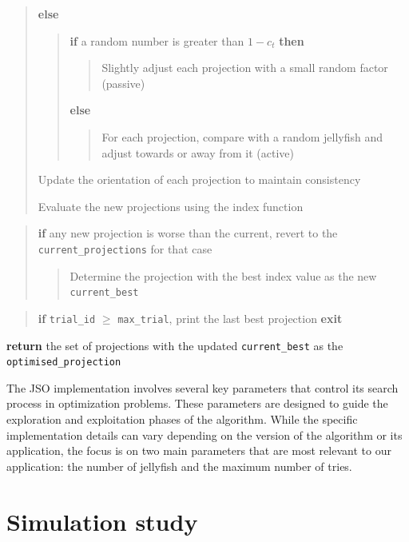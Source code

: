 \documentclass[
  12pt,
]{interact}
\theoremstyle{plain}
\begin{document}
\begin{tcolorbox}
\begin{quote}
\textbf{else}

\begin{quote}
\textbf{if} a random number is greater than \(1 - c_t\) \textbf{then}

\begin{quote}
Slightly adjust each projection with a small random factor (passive)
\end{quote}

\textbf{else}

\begin{quote}
For each projection, compare with a random jellyfish and adjust towards
or away from it (active)
\end{quote}
\end{quote}

Update the orientation of each projection to maintain consistency

Evaluate the new projections using the index function
\end{quote}

\begin{quote}
\textbf{if} any new projection is worse than the current, revert to the
\texttt{current\_projections} for that case

\begin{quote}
Determine the projection with the best index value as the new
\texttt{current\_best}
\end{quote}
\end{quote}

\begin{quote}
\textbf{if} \texttt{trial\_id} \(\ge\) \texttt{max\_trial}, print the
last best projection \textbf{exit}
\end{quote}

\textbf{return} the set of projections with the updated
\texttt{current\_best} as the \texttt{optimised\_projection}

\end{tcolorbox}

The JSO implementation involves several key parameters that control its
search process in optimization problems. These parameters are designed
to guide the exploration and exploitation phases of the algorithm. While
the specific implementation details can vary depending on the version of
the algorithm or its application, the focus is on two main parameters
that are most relevant to our application: the number of jellyfish and
the maximum number of tries.

\section{Simulation study}\label{sec-sim-deets}
\end{document}

